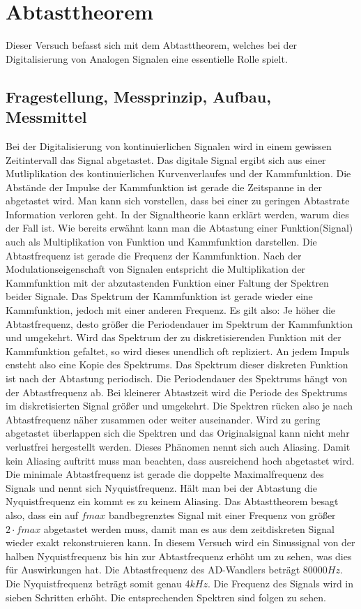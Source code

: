%
%
\chapter{Abtasttheorem}
Dieser Versuch befasst sich mit dem Abtasttheorem, welches bei der Digitalisierung von Analogen Signalen eine essentielle Rolle spielt.
\label{chap:Abtasttheorem}
\section{Fragestellung, Messprinzip, Aufbau, Messmittel}
\label{chap:VERSUCH_5_FRAGESTELLUNG}
Bei der Digitalisierung von kontinuierlichen Signalen wird in einem gewissen Zeitintervall das Signal abgetastet. Das digitale Signal ergibt sich aus einer Mutliplikation des kontinuierlichen Kurvenverlaufes und der Kammfunktion. Die Abstände der Impulse der Kammfunktion ist gerade die Zeitspanne in der abgetastet wird.
Man kann sich vorstellen, dass bei einer zu geringen Abtastrate Information verloren geht. In der Signaltheorie kann erklärt werden, warum dies der Fall ist. Wie bereits erwähnt kann man die Abtastung einer Funktion(Signal) auch als Multiplikation von Funktion und Kammfunktion darstellen. Die Abtastfrequenz ist gerade die Frequenz der Kammfunktion. Nach der Modulationseigenschaft von Signalen entspricht die Multiplikation der Kammfunktion mit der abzutastenden Funktion einer Faltung der Spektren beider Signale. Das Spektrum der Kammfunktion ist gerade wieder eine Kammfunktion, jedoch mit einer anderen Frequenz. Es gilt also: Je höher die Abtastfrequenz, desto größer die Periodendauer im Spektrum der Kammfunktion und umgekehrt. Wird das Spektrum der zu diskretisierenden Funktion mit der Kammfunktion gefaltet, so wird dieses unendlich oft repliziert. An jedem Impuls ensteht also eine Kopie des Spektrums. Das Spektrum dieser diskreten Funktion ist nach der Abtastung periodisch. Die Periodendauer des Spektrums hängt von der Abtastfrequenz ab. Bei kleinerer Abtastzeit wird die Periode des Spektrums im diskretisierten Signal größer und umgekehrt. Die Spektren rücken also je nach Abtastfrequenz näher zusammen oder weiter auseinander. 
Wird zu gering abgetastet überlappen sich die Spektren und das Originalsignal kann nicht mehr verlustfrei hergestellt werden. Dieses Phänomen nennt sich auch Aliasing. Damit kein Aliasing auftritt muss man beachten, dass ausreichend hoch abgetastet wird. Die minimale Abtastfrequenz ist gerade die doppelte Maximalfrequenz des Signals und nennt sich Nyquistfrequenz. Hält man bei der Abtastung die Nyquistfrequenz ein kommt es zu keinem Aliasing. 
Das Abtasttheorem besagt also, dass ein auf $fmax$ bandbegrenztes Signal mit einer Frequenz von größer $2 \cdot fmax$ abgetastet werden muss, damit man es aus dem zeitdiskreten Signal wieder exakt rekonstruieren kann.
In diesem Versuch wird ein Sinussignal von der halben Nyquistfrequenz bis hin zur Abtastfrequenz erhöht um zu sehen, was dies für Auswirkungen hat.
Die Abtastfrequenz des AD-Wandlers beträgt 80000$Hz$. Die Nyquistfrequenz beträgt somit genau 4$kHz$. Die Frequenz des Signals wird in sieben Schritten erhöht. Die entsprechenden Spektren sind folgen zu sehen.

